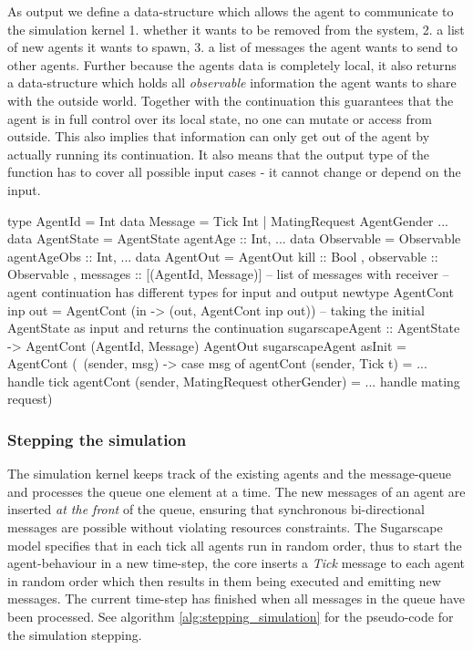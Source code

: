 As output we define a data-structure which allows the agent to communicate to the simulation kernel 1. whether it wants to be removed from the system, 2. a list of new agents it wants to spawn, 3. a list of messages the agent wants to send to other agents. Further because the agents data is completely local, it also returns a data-structure which holds all \textit{observable} information the agent wants to share with the outside world. Together with the continuation this guarantees that the agent is in full control over its local state, no one can mutate or access from outside. This also implies that information can only get out of the agent by actually running its continuation. It also means that the output type of the function has to cover all possible input cases - it cannot change or depend on the input. 

\begin{HaskellCode}
type AgentId    = Int
data Message    = Tick Int | MatingRequest AgentGender ... 
data AgentState = AgentState { agentAge :: Int, ... }             
data Observable = Observable { agentAgeObs :: Int, ... } 
data AgentOut   = AgentOut
  { kill       :: Bool
  , observable :: Observable
  , messages   :: [(AgentId, Message)] -- list of messages with receiver
  }
-- agent continuation has different types for input and output
newtype AgentCont inp out = AgentCont (in -> (out, AgentCont inp out))
-- taking the initial AgentState as input and returns the continuation
sugarscapeAgent :: AgentState -> AgentCont (AgentId, Message) AgentOut
sugarscapeAgent asInit = AgentCont (\ (sender, msg) -> 
  case msg of
    agentCont (sender, Tick t) = ... handle tick
    agentCont (sender, MatingRequest otherGender) = ... handle mating request)
\end{HaskellCode}

\subsubsection{Stepping the simulation}
The simulation kernel keeps track of the existing agents and the message-queue and processes the queue one element at a time. The new messages of an agent are inserted \textit{at the front} of the queue, ensuring that synchronous bi-directional messages are possible without violating resources constraints. The Sugarscape model specifies that in each tick all agents run in random order, thus to start the agent-behaviour in a new time-step, the core inserts a \textit{Tick} message to each agent in random order which then results in them being executed and emitting new messages. The current time-step has finished when all messages in the queue have been processed. See algorithm \ref{alg:stepping_simulation} for the pseudo-code for the simulation stepping.

